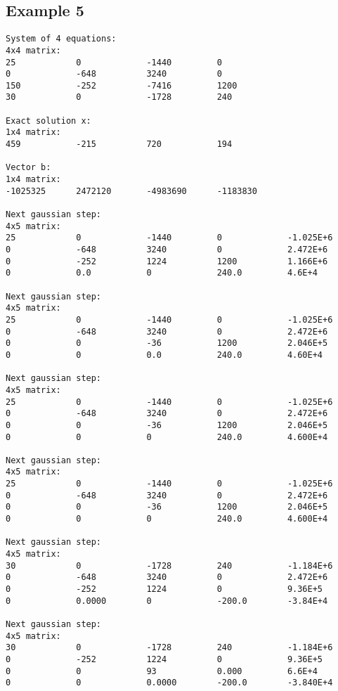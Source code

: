 \documentclass[letterpaper,12pt]{article}
\begin{document}
\subsection{Example 5}
\label{a:E5}
\begin{verbatim}
System of 4 equations:
4x4 matrix:
25            0             -1440         0             
0             -648          3240          0             
150           -252          -7416         1200          
30            0             -1728         240           

Exact solution x:
1x4 matrix:
459           -215          720           194           

Vector b:
1x4 matrix:
-1025325      2472120       -4983690      -1183830      

Next gaussian step:
4x5 matrix:
25            0             -1440         0             -1.025E+6     
0             -648          3240          0             2.472E+6      
0             -252          1224          1200          1.166E+6      
0             0.0           0             240.0         4.6E+4        

Next gaussian step:
4x5 matrix:
25            0             -1440         0             -1.025E+6     
0             -648          3240          0             2.472E+6      
0             0             -36           1200          2.046E+5      
0             0             0.0           240.0         4.60E+4       

Next gaussian step:
4x5 matrix:
25            0             -1440         0             -1.025E+6     
0             -648          3240          0             2.472E+6      
0             0             -36           1200          2.046E+5      
0             0             0             240.0         4.600E+4      

Next gaussian step:
4x5 matrix:
25            0             -1440         0             -1.025E+6     
0             -648          3240          0             2.472E+6      
0             0             -36           1200          2.046E+5      
0             0             0             240.0         4.600E+4      

Next gaussian step:
4x5 matrix:
30            0             -1728         240           -1.184E+6     
0             -648          3240          0             2.472E+6      
0             -252          1224          0             9.36E+5       
0             0.0000        0             -200.0        -3.84E+4      

Next gaussian step:
4x5 matrix:
30            0             -1728         240           -1.184E+6     
0             -252          1224          0             9.36E+5       
0             0             93            0.000         6.6E+4        
0             0             0.0000        -200.0        -3.840E+4     


\end{verbatim}
\end{document}
